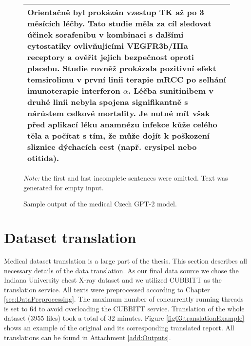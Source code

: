 \begin{figure}[htb]
\begin{tabular}{|l|}
{Orientačně byl prokázán vzestup TK až po 3 měsících léčby.\newline
Tato studie měla za cíl sledovat účinek sorafenibu v kombinaci s dalšími cytostatiky ovlivňujícími VEGFR3b/IIIa receptory a ověřit jejich bezpečnost oproti placebu. Studie rovněž prokázala pozitivní efekt temsirolimu v první linii terapie mRCC po selhání imunoterapie interferon $\alpha$. Léčba sunitinibem v druhé linii nebyla spojena signifikantně s nárůstem celkové mortality.\newline
Je nutné mít však před aplikací léku anamnézu infekce kůže celého těla a počítat s tím, že může dojít k poškození sliznice dýchacích cest (např. erysipel nebo otitida).\vspace{0.25em}}
\\ \hline
             \end{tabular}
        \caption{Sample output of the medical Czech GPT-2 model.}
	\label{fig02:gpt2MedExample}
\textit{Note:} the first and last incomplete sentences were omitted. Text was generated for empty input.
\end{figure}

\section{Dataset translation}
Medical dataset translation is a large part of the thesis. This section describes all necessary details of the data translation. As our final data source we chose the Indiana University chest X-ray dataset and we utilized CUBBITT as the translation service. All texts were preprocessed according to Chapter \ref{sec:DataPreprocessing}. The maximum number of concurrently running threads is set to 64 to avoid overloading the CUBBITT service. Translation of the whole dataset (3955 files) took a total of 32 minutes. Figure \ref{fig03:translationExample} shows an example of the original and its corresponding translated report. All translations can be found in Attachment \ref{add:Outputs}.

